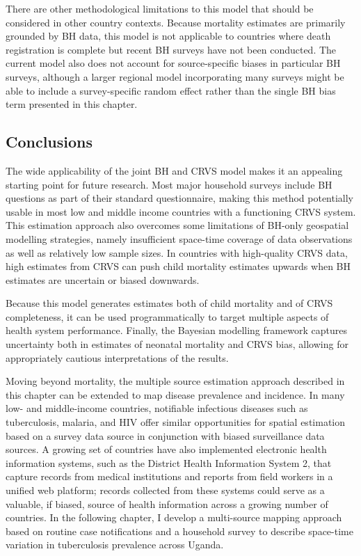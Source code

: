\documentclass[
]{report}
\begin{document}
There are other methodological limitations to this model that should be considered in other country contexts. Because mortality estimates are primarily grounded by BH data, this model is not applicable to countries where death registration is complete but recent BH surveys have not been conducted. The current model also does not account for source-specific biases in particular BH surveys, although a larger regional model incorporating many surveys might be able to include a survey-specific random effect rather than the single BH bias term presented in this chapter.

\hypertarget{conclusions}{%
\subsection{Conclusions}\label{conclusions}}

The wide applicability of the joint BH and CRVS model makes it an appealing starting point for future research. Most major household surveys include BH questions as part of their standard questionnaire, making this method potentially usable in most low and middle income countries with a functioning CRVS system. This estimation approach also overcomes some limitations of BH-only geospatial modelling strategies, namely insufficient space-time coverage of data observations as well as relatively low sample sizes.\autocite{Burstein2019,Wakefield2019} In countries with high-quality CRVS data, high estimates from CRVS can push child mortality estimates upwards when BH estimates are uncertain or biased downwards.

Because this model generates estimates both of child mortality and of CRVS completeness, it can be used programmatically to target multiple aspects of health system performance. Finally, the Bayesian modelling framework captures uncertainty both in estimates of neonatal mortality and CRVS bias, allowing for appropriately cautious interpretations of the results.

Moving beyond mortality, the multiple source estimation approach described in this chapter can be extended to map disease prevalence and incidence. In many low- and middle-income countries, notifiable infectious diseases such as tuberculosis, malaria, and HIV offer similar opportunities for spatial estimation based on a survey data source in conjunction with biased surveillance data sources.\autocite{Rood2019,Dwyer-Lindgren2019} A growing set of countries have also implemented electronic health information systems, such as the District Health Information System 2, that capture records from medical institutions and reports from field workers in a unified web platform;\autocite{Dehnavieh2019} records collected from these systems could serve as a valuable, if biased, source of health information across a growing number of countries. In the following chapter, I develop a multi-source mapping approach based on routine case notifications and a household survey to describe space-time variation in tuberculosis prevalence across Uganda.
\end{document}
